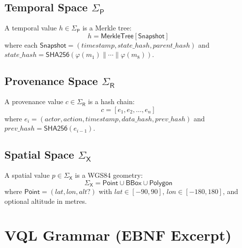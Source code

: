 \documentclass[11pt,twocolumn]{article}
\begin{document}
\subsection{Temporal Space $\Sigma_\mathsf{P}$}

A temporal value $h \in \Sigma_\mathsf{P}$ is a Merkle tree:
\[
  h = \mathsf{MerkleTree}[\mathsf{Snapshot}]
\]
where each $\mathsf{Snapshot} = (\mathit{timestamp}, \mathit{state\_hash},
\mathit{parent\_hash})$ and $\mathit{state\_hash} =
\mathsf{SHA256}(\varphi(m_1) \| \cdots \| \varphi(m_8))$.

\subsection{Provenance Space $\Sigma_\mathsf{R}$}

A provenance value $c \in \Sigma_\mathsf{R}$ is a hash chain:
\[
  c = [e_1, e_2, \ldots, e_n]
\]
where $e_i = (\mathit{actor}, \mathit{action}, \mathit{timestamp},
\mathit{data\_hash}, \mathit{prev\_hash})$ and
$\mathit{prev\_hash} = \mathsf{SHA256}(e_{i-1})$.

\subsection{Spatial Space $\Sigma_\mathsf{X}$}

A spatial value $p \in \Sigma_\mathsf{X}$ is a WGS84 geometry:
\[
  \Sigma_\mathsf{X} = \mathsf{Point} \cup \mathsf{BBox} \cup \mathsf{Polygon}
\]
where $\mathsf{Point} = (\mathit{lat}, \mathit{lon}, \mathit{alt}?)$ with
$\mathit{lat} \in [-90, 90]$, $\mathit{lon} \in [-180, 180]$, and optional
altitude in metres.

\section{VQL Grammar (EBNF Excerpt)}\label{app:vql-grammar}
\end{document}
